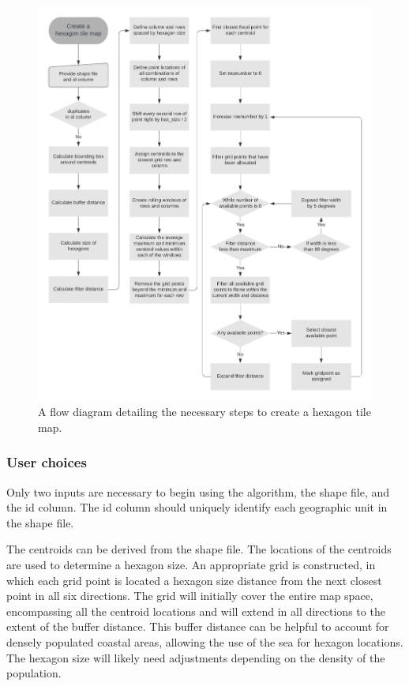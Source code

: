 \documentclass{monashthesis}
\begin{document}
\begin{figure}
\includegraphics[width=14cm]{figures/03-algorithm/sugarbag_flow.pdf}
\caption{\label{fig:sugarbag_flow}A flow diagram detailing the necessary steps to create a hexagon tile map.}
\end{figure}

\hypertarget{user-choices}{%
\subsubsection{User choices}\label{user-choices}}

Only two inputs are necessary to begin using the algorithm, the shape file, and the id column. The id column should uniquely identify each geographic unit in the shape file.

The centroids can be derived from the shape file. The locations of the centroids are used to determine a hexagon size. An appropriate grid is constructed, in which each grid point is located a hexagon size distance from the next closest point in all six directions.
The grid will initially cover the entire map space, encompassing all the centroid locations and will extend in all directions to the extent of the buffer distance. This buffer distance can be helpful to account for densely populated coastal areas, allowing the use of the sea for hexagon locations. The hexagon size will likely need adjustments depending on the density of the population.
\end{document}
